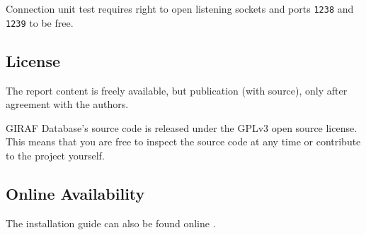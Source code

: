 Connection unit test requires right to open listening sockets and ports \lstinline|1238| and \lstinline|1239| to be free.

\subsection{License}
The report content is freely available, but publication (with source), only after agreement with the authors.

GIRAF Database's source code is released under the GPLv3 \cite{GNUlicense} open source license. This means that you are free to inspect the source code at any time or contribute to the project yourself.

\subsection*{Online Availability} The installation guide can also be found online \cite{install}.